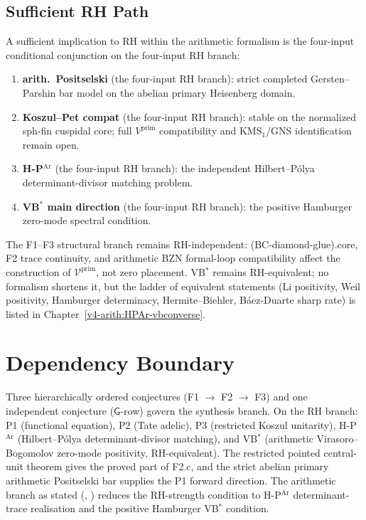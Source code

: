 \subsection{Sufficient RH Path}

A sufficient implication to RH within the arithmetic formalism is the
four-input conditional conjunction on the four-input RH branch:

\begin{enumerate}
\item \textbf{arith.~Positselski} (the four-input RH branch): strict completed
Gersten--Parshin bar model on the abelian primary Heisenberg domain.
\item \textbf{Koszul--Pet compat} (the four-input RH branch): stable on the normalized
sph-fin cuspidal core; full \(V^{\mathrm{prim}}\) compatibility and
KMS\(_1\)/GNS identification remain open.
\item \textbf{H-P\(^{\mathrm{Ar}}\)} (the four-input RH branch): the independent
Hilbert--P\'olya determinant-divisor matching problem.
\item \textbf{VB\(^{*}\) main direction} (the four-input RH branch): the positive
Hamburger zero-mode spectral condition.
\end{enumerate}

The F1--F3 structural branch remains RH-independent: (BC-diamond-glue).core,
F2 trace continuity, and arithmetic BZN formal-loop compatibility affect the
construction of \(\mathcal{V}^{\mathrm{prim}}\), not zero
placement. VB\(^{*}\) remains RH-equivalent; no formalism shortens it,
but the ladder of equivalent statements (Li positivity, Weil
positivity, Hamburger determinacy, Hermite--Biehler, B\'aez-Duarte
sharp rate) is listed in
Chapter~\ref{v4-arith:HPAr-vbconverse}.

\section{Dependency Boundary}
\label{v4-arith:app:C:summary}

Three hierarchically ordered conjectures (F1 \(\to\) F2 \(\to\) F3)
and one independent conjecture (\(\mathsf{G}\)-row) govern the
synthesis branch. On the RH branch: P1 (functional equation),
P2 (Tate adelic), P3 (restricted Koszul unitarity),
H-P\(^{\mathrm{Ar}}\) (Hilbert--P\'olya determinant-divisor matching), and
VB\(^{*}\) (arithmetic Virasoro--Bogomolov zero-mode positivity,
RH-equivalent). The restricted pointed central-unit theorem gives the
proved part of F2.c, and the strict abelian primary arithmetic
Positselski bar supplies the P1 forward direction. The arithmetic branch as stated
(, ) reduces
the RH-strength condition to H-P\(^{\mathrm{Ar}}\) determinant-trace
realisation and the positive Hamburger VB\(^{*}\) condition.
